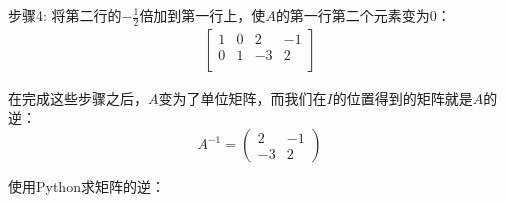 \begin{exercise}
步骤4: 将第二行的\(-\frac{1}{2}\)倍加到第一行上，使\(A\)的第一行第二个元素变为0：
\begin{align*}
\left[\begin{array}{cc|cc}
1 & 0 & 2 & -1 \\
0 & 1 & -3 & 2 \\
\end{array}\right]
\end{align*}

在完成这些步骤之后，\(A\)变为了单位矩阵，而我们在\(I\)的位置得到的矩阵就是\(A\)的逆：
\[A^{-1} = \begin{pmatrix} 2 & -1 \\ -3 & 2 \end{pmatrix}\]

\end{exercise}

使用Python求矩阵的逆：




